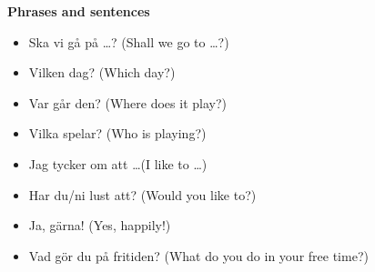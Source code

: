 
\begin{flushleft}
    \textbf{Phrases and sentences}
    \begin{itemize}
        \item Ska vi gå på \ldots? (Shall we go to \ldots?)
        \item Vilken dag? (Which day?)
        \item Var går den? (Where does it play?)
        \item Vilka spelar? (Who is playing?)
        \item Jag tycker om att \ldots (I like to \ldots)
        \item Har du/ni lust att? (Would you like to?)
        \item Ja, gärna! (Yes, happily!)
        \item Vad gör du på fritiden? (What do you do in your free time?)
    \end{itemize}
\end{flushleft}

